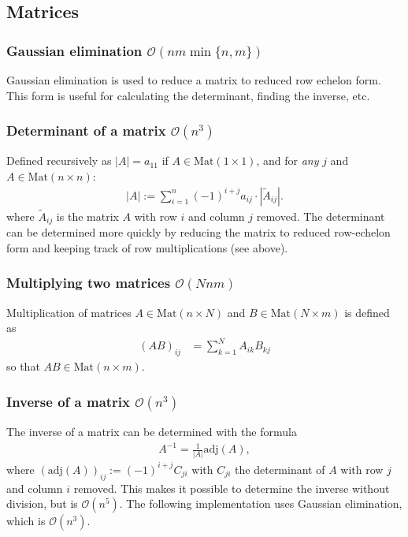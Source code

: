 \subsection{Matrices}

\subsubsection{Gaussian elimination $\mathcal O(nm\min\{n,m\})$}
Gaussian elimination is used to reduce a matrix to reduced row echelon form. This form is useful for calculating the determinant, finding the inverse, etc.

\subsubsection{Determinant of a matrix $\mathcal{O}(n^3)$}
Defined recursively as $|A| = a_{11}$ if $A \in \text{Mat}(1 \times 1)$, and
for \textit{any} $j$ and $A \in \text{Mat}(n \times n)$:
\begin{align*}
    |A| := \sum_{i=1}^n (-1)^{i+j} a_{ij} \cdot |\tilde A_{ij}|.
\end{align*}
where $\tilde A_{ij}$ is the matrix $A$ with row $i$ and column $j$ removed. The determinant can be determined more quickly by reducing the matrix to reduced row-echelon form and keeping track of row multiplications (see above).

\subsubsection{Multiplying two matrices $\mathcal O(Nnm)$}
Multiplication of matrices $A \in \text{Mat}(n \times N)$ and $B \in \text{Mat}(N \times m)$ is defined as
\begin{align*}
    (AB)_{ij} &= \sum_{k=1}^N A_{ik} B_{kj}
\end{align*}
so that $AB \in \text{Mat}(n \times m)$.

\subsubsection{Inverse of a matrix $\mathcal O(n^3)$}
The inverse of a matrix can be determined with the formula
\begin{align*}
    A^{-1} = \frac1{|A|}\text{adj}(A),
\end{align*}
where $(\text{adj}(A))_{ij} := (-1)^{i + j}C_{ji}$ with $C_{ji}$ the determinant of $A$ with row $j$ and column $i$ removed. This makes it possible to determine the inverse without division, but is $\mathcal O(n^5)$. The following implementation uses Gaussian elimination, which is $\mathcal O(n^3)$.

